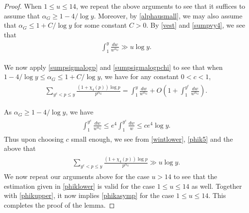 \documentclass[10pt,a4paper]{amsart}
\begin{document}
\begin{proof}
  When $1 \leq u \leq 14$, we repeat the above arguments to see that it suffices to assume that $\alpha_G \geq 1-4/\log y$. Moreover, by \eqref{alphausmall}, we may also assume that $\alpha_G \leq 1+C/\log y$ for some constant $C>0$.  By \eqref{vest} and \eqref{sumpvy4}, we see that 
\begin{align}
\label{wintlower}
\begin{split}
  \int^y_1\frac {dw}{w^{\alpha_G}} \gg u \log y.
\end{split}
\end{align}   

  We now apply \eqref{sumpsigmalogp} and \eqref{sumpsigmalogpchi} to see that when $1-4/\log y \leq \alpha_G \leq 1+C/\log y$,  we have for any constant $0<c<1$, 
\begin{align}
\label{phik5}
\begin{split}
  \sum_{y^c < p \leq y}\frac {(1+\chi_4(p))\log p}{p^{\alpha_G}} =\int^y_{1}\frac {dw}{w^{\alpha_G}}+O(1+\int^{y^c}_1\frac {dw}{w^{\alpha_G}}).
\end{split}
\end{align}   
  
  As $\alpha_G \geq 1-4/\log y$, we have   
\begin{align*}
\begin{split}
 \int^{y^c}_1\frac {dw}{w^{\alpha_G}} \leq e^4\int^{y^c}_1\frac {dw}{w} \leq ce^4 \log y.
\end{split}
\end{align*}     
  Thus upon choosing $c$ small enough, we see from \eqref{wintlower}, \eqref{phik5} and the above that 
\begin{align*}
\begin{split}
  \sum_{y^c < p \leq y}\frac {(1+\chi_4(p))\log p}{p^{\alpha_G}} \gg u\log y. 
\end{split}
\end{align*}   
  We now repeat our arguments above for the case $u > 14$ to see that the estimation given in \eqref{phiklower} is valid for the case $1 \leq u \leq 14$ as well. Together with \eqref{phikupper}, it now implies \eqref{phikasymp} for the case  $1 \leq u \leq 14$. 
  This completes the proof of the lemma. 
\end{proof}
\end{document}
